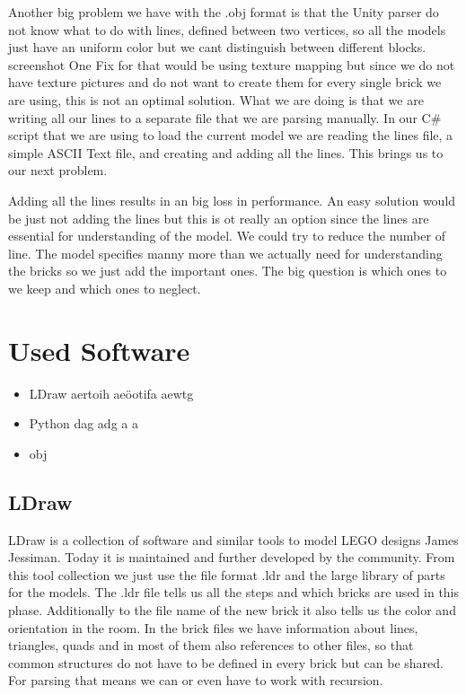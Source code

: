 \documentclass[11pt,a4paper]{article}
\begin{document}
\begin{description}[align=left]
		\item [Lines]
		Another big problem we have with the .obj format is that the Unity parser do not know what to do with lines, defined between two vertices, so all the models just have an uniform color but we cant distinguish between different blocks.  {screenshot} One Fix for that would be using texture mapping but since we do not have texture pictures and do not want to create them for every single brick we are using, this is not an optimal solution. What we are doing is that we are writing all our lines to a separate file that we are parsing manually. In our C\# script that we are using to load the current model we are reading the lines file, a simple ASCII Text file, and creating and adding all the lines.  This brings us to our next problem.
		
		\item [Performance]
		Adding all the lines results in an big loss in performance. An easy solution would be just not adding the lines but this is ot really an option since the lines are essential for understanding of the model. We could try to reduce the number of line. The model specifies manny more than we actually need for understanding the bricks so we just add the important ones. The big question is which ones to we keep and which ones to neglect.
		
	\end{description}
	
\section{Used Software}

	\begin{itemize}
		\item LDraw
		aertoih aeöotifa aewtg
		\item Python
		dag adg a a
		\item obj
		
	\end{itemize}
	
	\subsection{LDraw}
	
	LDraw is a collection of software and similar tools to model LEGO designs James Jessiman. Today it is maintained and further developed by the community. From this tool collection we just use the file format .ldr and the large library of parts for the models. The .ldr file tells us all the steps and which bricks are used in this phase. Additionally to the file name of the new brick it also tells us the color and orientation in the room. In the brick files we have information about lines, triangles, quads and in most of them also references to other files, so that common structures do not have to be defined in every brick but can be shared. For parsing that means we can or even have to work with recursion.
	
\end{document}
